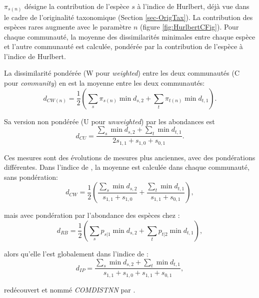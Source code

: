 \documentclass[
  11pt,
  french,
  a4paper,
  extrafontsizes,onecolumn,openright
  ]{memoir}
\begin{document}
\(\pi_{s(n)}\) désigne la contribution de l'espèce \(s\) à l'indice de Hurlbert, déjà vue dans le cadre de l'originalité taxonomique (Section \ref{sec-OrigTax}).
La contribution des espèces rares augmente avec le paramètre \(n\) (figure \ref{fig:HurlbertCFig}).
Pour chaque communauté, la moyenne des dissimilarités minimales entre chaque espèce et l'autre communauté est calculée, pondérée par la contribution de l'espèce à l'indice de Hurlbert.

La dissimilarité pondérée (W pour \emph{weighted}) entre les deux communautés (C pour \emph{community}) en est la moyenne entre les deux communautés:
\begin{equation}
  \label{eq:CWn}
  d_{\mathit{CW}(n)} = \frac{1}{2}\left(\sum_s{\pi_{s(n)} \min{d_{s,2}}} + \sum_t{\pi_{t(n)} \min{d_{t,1}}} \right).
\end{equation}

Sa version non pondérée (U pour \emph{unweighted}) par les abondances est \autocite{Ricotta2008}
\begin{equation}
  \label{eq:CU}
  d_{\mathit{CU}} = \frac{\sum_s{\min{d_{s,2}}} + \sum_t{\min{d_{t,1}}}}{2s_{1,1}+s_{1,0}+s_{0,1}}.
\end{equation}

Ces mesures sont des évolutions de mesures plus anciennes, avec des pondérations différentes.
Dans l'indice de \textcite{Clarke1998}, la moyenne est calculée dans chaque communauté, sans pondération:
\begin{equation}
  \label{eq:CW}
  d_{\mathit{CW}} = \frac{1}{2}\left( \frac{\sum_s{\min{d_{s,2}}}}{s_{1,1}+s_{1,0}} + \frac{\sum_t{\min{d_{t,1}}}}{s_{1,1}+s_{0,1}} \right),
\end{equation}

mais avec pondération par l'abondance des espèces chez \textcite{Ricotta2008} :
\begin{equation}
  \label{eq:Ricotta2008}
  d_{\mathit{RB}} = \frac{1}{2}\left( \sum_s{p_{s|1}\min{d_{s,2}}} + \sum_t{p_{t|2}\min{d_{t,1}}} \right),
\end{equation}

alors qu'elle l'est globalement dans l'indice de \textcite{Izsak2001} :
\begin{equation}
  \label{eq:Izsak2001}
  d_{\mathit{IP}} = \frac{\sum_s{\min{d_{s,2}}} + \sum_t{\min{d_{t,1}}}}{s_{1,1}+s_{1,0}+s_{1,1}+s_{0,1}},
\end{equation}

redécouvert et nommé \emph{COMDISTNN} par \textcite{Webb2008}.
\end{document}
